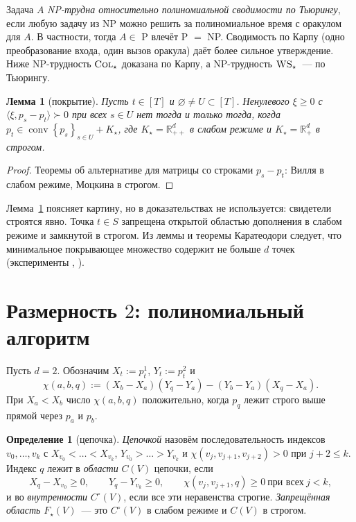 \documentclass[a4paper,11pt]{article}
\theoremstyle{plain}
\newtheorem{lemma}[theorem]{Лемма}
\theoremstyle{definition}
\newtheorem{definition}[theorem]{Определение}
\theoremstyle{remark}
\newcommand{\R}{\mathbb{R}}
\newcommand{\set}[1]{\left\{ #1 \right\}}
\newcommand{\ip}[2]{\langle #1, #2\rangle}
\newcommand{\Rpp}[1][2]{\R^{#1}_{++}}
\newcommand{\Rp}[1][2]{\R^{#1}_{+}}
\DeclareMathOperator{\conv}{conv}
\newcommand{\WS}{\textsc{WS}}
\newcommand{\COL}{\textsc{Col}}
\newcommand{\gs}{\mathrel{\succ}}
\begin{document}
Задача $A$ \emph{NP-трудна относительно полиномиальной сводимости по Тьюрингу}, если любую задачу из NP можно решить за полиномиальное время с оракулом для $A$. В частности, тогда $A\in$ P влечёт P $=$ NP. Сводимость по Карпу (одно преобразование входа, один вызов оракула) даёт более сильное утверждение. Ниже NP-трудность $\COL_\star$ доказана по Карпу, а NP-трудность $\WS_\star$~--- по Тьюрингу.

\begin{lemma}[покрытие]\label{lem:cover}
    Пусть $t\in[T]$ и $\varnothing\ne U\subset[T]$. Ненулевого $\xi\ge0$ с $\ip{\xi}{p_s-p_t}\gs0$ при всех $s\in U$ нет тогда и только тогда, когда $p_t\in\conv\set{p_s}_{s\in U}+K_\star$, где $K_\star=\Rpp[d]$ в слабом режиме и $K_\star=\Rp[d]$ в строгом.
\end{lemma}

\begin{proof}
    Теоремы об альтернативе для матрицы со строками $p_s-p_t$: Вилля в слабом режиме, Моцкина в строгом.
\end{proof}

Лемма~\ref{lem:cover} поясняет картину, но в доказательствах не используется: свидетели строятся явно. Точка $t\in S$ запрещена открытой областью дополнения в слабом режиме и замкнутой в строгом. Из леммы и теоремы Каратеодори следует, что минимальное покрывающее множество содержит не больше $d$ точек (эксперименты , ).

\section{Размерность $2$: полиномиальный алгоритм}

Пусть $d=2$. Обозначим $X_t:=p^1_t$, $Y_t:=p^2_t$ и
\[
    \chi(a,b,q):=(X_b-X_a)(Y_q-Y_a)-(Y_b-Y_a)(X_q-X_a).
\]
При $X_a<X_b$ число $\chi(a,b,q)$ положительно, когда $p_q$ лежит строго выше прямой через $p_a$ и $p_b$.

\begin{definition}[цепочка]\label{def:chain}
    \emph{Цепочкой} назовём последовательность индексов $v_0,\dots,v_k$ с $X_{v_0}<\dots<X_{v_k}$, $Y_{v_0}>\dots>Y_{v_k}$ и $\chi(v_j,v_{j+1},v_{j+2})>0$ при $j+2\le k$. Индекс $q$ лежит в \emph{области} $C(V)$ цепочки, если
    \[
        X_q-X_{v_0}\ge0,\qquad Y_q-Y_{v_k}\ge0,\qquad \chi(v_j,v_{j+1},q)\ge0\ \text{при всех}\ j<k,
    \]
    и во \emph{внутренности} $C^\circ(V)$, если все эти неравенства строгие. \emph{Запрещённая область} $F_\star(V)$~--- это $C^\circ(V)$ в слабом режиме и $C(V)$ в строгом.
\end{definition}
\end{document}
